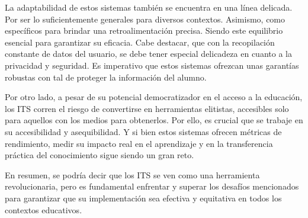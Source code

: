 La adaptabilidad de estos sistemas también se encuentra en una línea delicada. Por ser lo suficientemente generales para diversos contextos. Asimismo, como específicos para brindar una retroalimentación precisa. Siendo este equilibrio esencial para garantizar su eficacia. Cabe destacar, que con la recopilación constante de datos del usuario, se debe tener especial delicadeza en cuanto a la privacidad y seguridad. Es imperativo que estos sistemas ofrezcan unas garantías robustas con tal de proteger la información del alumno.

Por otro lado, a pesar de su potencial democratizador en el acceso a la educación, los ITS corren el riesgo de convertirse en herramientas elitistas, accesibles solo para aquellos con los medios para obtenerlos. Por ello, es crucial que se trabaje en su accesibilidad y asequibilidad. Y si bien estos sistemas ofrecen métricas de rendimiento, medir su impacto real en el aprendizaje y en la transferencia práctica del conocimiento sigue siendo un gran reto.

En resumen, se podría decir que los ITS se ven como una herramienta revolucionaria, pero es fundamental enfrentar y superar los desafíos mencionados para garantizar que su implementación sea efectiva y equitativa en todos los contextos educativos.